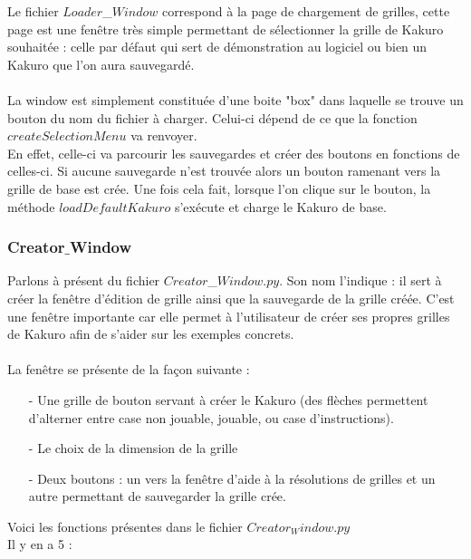 \documentclass[french,12pt]{article}
\begin{document}
Le fichier $Loader$\_$Window$ correspond à la page de chargement de grilles, cette page est une fenêtre très simple permettant de sélectionner la grille de Kakuro souhaitée : celle par défaut qui sert de démonstration au logiciel ou bien un Kakuro que l'on aura sauvegardé. \\ \\
La window est simplement constituée d'une boite "box" dans laquelle se trouve un bouton du nom du fichier à charger. Celui-ci dépend de ce que la fonction $createSelectionMenu$ va renvoyer. \\
En effet, celle-ci va parcourir les sauvegardes et créer des boutons en fonctions de celles-ci. Si aucune sauvegarde n'est trouvée alors un bouton ramenant vers la grille de base est crée. 
Une fois cela fait, lorsque l'on clique sur le bouton, la méthode $loadDefaultKakuro$ s'exécute et charge le Kakuro de base.

\subsubsection{Creator$\_$Window}

Parlons à présent du fichier $Creator$\_$Window.py$. Son nom l'indique : il sert à créer la fenêtre d'édition de grille ainsi que la sauvegarde de la grille créée. C'est une fenêtre importante car elle permet à l'utilisateur de créer ses propres grilles de Kakuro afin de s'aider sur les exemples concrets. \\ \\
La fenêtre se présente de la façon suivante : 

\begin{enumerate}
	\item[-] Une grille de bouton servant à créer le Kakuro (des flèches permettent 			d'alterner entre case non jouable, jouable, ou case d'instructions).
	\item[-] Le choix de la dimension de la grille
	\item[-] Deux boutons : un vers la fenêtre d'aide à la résolutions de grilles et un 		autre permettant de sauvegarder la grille crée. \\
\end{enumerate}
\newpage 

Voici les fonctions présentes dans le fichier $Creator_Window.py$ \\
Il y en a 5 : \\
\end{document}
